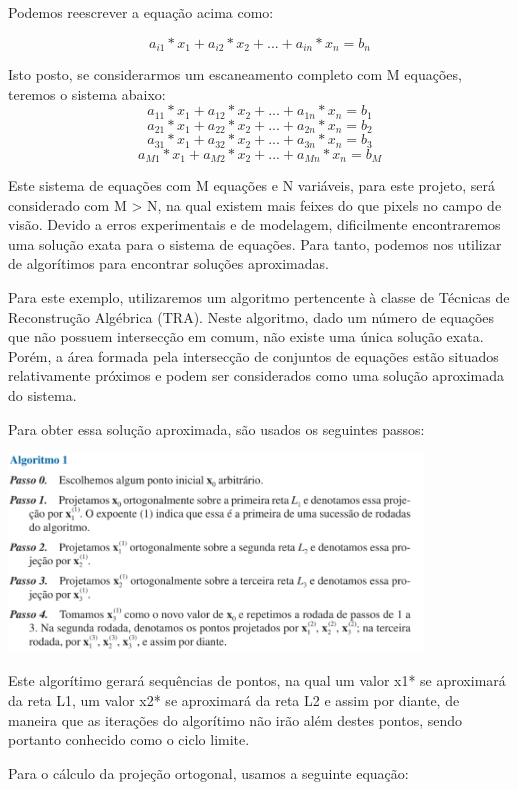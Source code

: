 \documentclass[a4paper, 12pt]{article}
\begin{document}
Podemos reescrever a equação acima como:

$$a_{i1}*x_1 + a_{i2}*x_2 + ... + a_{in}*x_n = b_n$$

Isto posto, se considerarmos um escaneamento completo com M equações, teremos o sistema abaixo:
$$a_{11}*x_1 + a_{12}*x_2 + ... + a_{1n}*x_n = b_1$$
$$a_{21}*x_1 + a_{22}*x_2 + ... + a_{2n}*x_n = b_2$$
$$a_{31}*x_1 + a_{32}*x_2 + ... + a_{3n}*x_n = b_3$$
$$a_{M1}*x_1 + a_{M2}*x_2 + ... + a_{Mn}*x_n = b_M$$
    
Este sistema de equações com M equações e N variáveis, para este projeto, será considerado com M > N, na qual existem mais feixes do que pixels no campo de visão. Devido a erros experimentais e de modelagem, dificilmente encontraremos uma solução exata para o sistema de equações. Para tanto, podemos nos utilizar de algorítimos para encontrar soluções aproximadas.

Para este exemplo, utilizaremos um algoritmo pertencente à classe de Técnicas de Reconstrução Algébrica (TRA). Neste algoritmo, dado um número de equações que não possuem intersecção em comum, não existe uma única solução exata. Porém, a área formada pela intersecção de conjuntos de equações estão situados relativamente próximos e podem ser considerados como uma solução aproximada do sistema.

Para obter essa solução aproximada, são usados os seguintes passos:



\begin{center}
    \includegraphics[width=11cm]{algoritimo.png}
\end{center}

Este algorítimo gerará sequências de pontos, na qual um valor x1* se aproximará da reta L1, um valor x2* se aproximará da reta L2 e assim por diante, de maneira que as iterações do algorítimo não irão além destes pontos, sendo portanto conhecido como o ciclo limite.

Para o cálculo da projeção ortogonal, usamos a seguinte equação:
\end{document}
